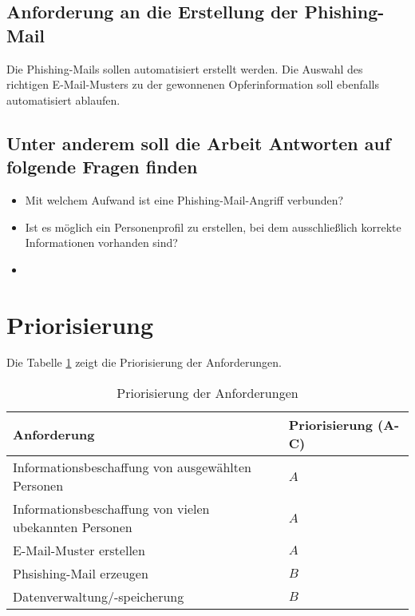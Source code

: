 	\subsection{Anforderung an die Erstellung der Phishing-Mail}
	Die Phishing-Mails sollen automatisiert erstellt werden. Die Auswahl des richtigen E-Mail-Musters zu der gewonnenen Opferinformation soll ebenfalls automatisiert ablaufen.
	
	\subsection{Unter anderem soll die Arbeit Antworten auf folgende Fragen finden}
	\begin{itemize}
		\item Mit welchem Aufwand ist eine Phishing-Mail-Angriff verbunden?
		\item Ist es möglich ein Personenprofil zu erstellen, bei dem ausschließlich korrekte Informationen vorhanden sind?
		\item 
	\end{itemize}
\FloatBarrier

\section{Priorisierung} %
\label{sec:} %
Die Tabelle \ref{tab:prio} zeigt die Priorisierung der Anforderungen.

\begin{table}
	\caption{Priorisierung der Anforderungen}
	\label{tab:prio}
	\begin{center} 
		\begin{tabular}{|l|l|}
			\hline
			Anforderung & Priorisierung (A-C) \\
			\hline
			Informationsbeschaffung von ausgewählten Personen & $ A $ \\
			\hline
			Informationsbeschaffung von vielen ubekannten Personen & $ A $ \\
			\hline
			E-Mail-Muster erstellen & $ A $    \\
			\hline
			Phsishing-Mail erzeugen & $ B $   \\
			\hline
			Datenverwaltung/-speicherung & $ B $   \\
			\hline
		\end{tabular}
	\end{center}
\end{table}